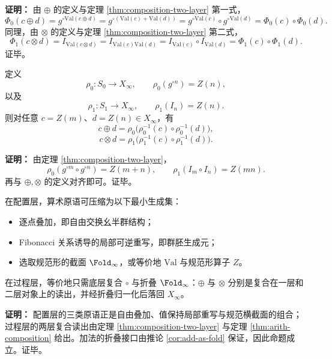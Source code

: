 \textbf{证明：}
由 \(\oplus\) 的定义与定理 \ref{thm:composition-two-layer} 第一式，
\[
\Phi_0(c\oplus d)
=g^{\circ \mathrm{Val}(c\oplus d)}
=g^{\circ(\mathrm{Val}(c)+\mathrm{Val}(d))}
=g^{\circ \mathrm{Val}(c)}\circ g^{\circ \mathrm{Val}(d)}
=\Phi_0(c)\circ \Phi_0(d).
\]
同理，由 \(\otimes\) 的定义与定理 \ref{thm:composition-two-layer} 第二式，
\[
\Phi_1(c\otimes d)
=I_{\mathrm{Val}(c\otimes d)}
=I_{\mathrm{Val}(c)\mathrm{Val}(d)}
=I_{\mathrm{Val}(c)}\circ I_{\mathrm{Val}(d)}
=\Phi_1(c)\circ \Phi_1(d).
\]
证毕。

\begin{corollary}[仅复合的读出落回稳定地址]\label{cor:composition-pullback}
定义
\[
\rho_0:S_0\to X_\infty,\qquad \rho_0(g^{\circ n})=Z(n),
\]
以及
\[
\rho_1:S_1\to X_\infty,\qquad \rho_1(I_n)=Z(n).
\]
则对任意 \(c=Z(m)\)、\(d=Z(n)\in X_\infty\)，有
\[
c\oplus d=\rho_0\bigl(\rho_0^{-1}(c)\circ \rho_0^{-1}(d)\bigr),
\]
\[
c\otimes d=\rho_1\bigl(\rho_1^{-1}(c)\circ \rho_1^{-1}(d)\bigr).
\]
\end{corollary}

\textbf{证明：}
由定理 \ref{thm:composition-two-layer}，
\[
\rho_0(g^{\circ m}\circ g^{\circ n})=Z(m+n),
\qquad
\rho_1(I_m\circ I_n)=Z(mn).
\]
再与 \(\oplus,\otimes\) 的定义对齐即可。证毕。

\begin{corollary}\label{cor:primitive-free-arith}
在配置层，算术原语可压缩为以下最小生成集：
\begin{itemize}
  \item 逐点叠加，即自由交换幺半群结构；
  \item Fibonacci 关系诱导的局部可逆重写，即群胚生成元；
  \item 选取规范形的截面 \(\Fold_\infty\)，或等价地 \(\mathrm{Val}\) 与规范形算子 \(Z\)。
\end{itemize}
在过程层，等价地只需底层复合 \(\circ\) 与折叠 \(\Fold_\infty\)：\(\oplus\) 与 \(\otimes\) 分别是复合在一层和二层对象上的读出，并经折叠归一化后落回 \(X_\infty\)。
\end{corollary}

\textbf{证明：}
配置层的三类原语正是自由叠加、值保持局部重写与规范横截面的组合；过程层的两层复合读出由定理 \ref{thm:composition-two-layer} 与定理 \ref{thm:arith-composition} 给出。加法的折叠接口由推论 \ref{cor:add-as-fold} 保证，因此命题成立。证毕。

